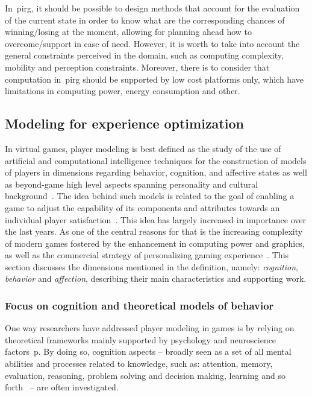 In~\gls{pirg}, it should be possible to design methods that account for the evaluation of the current state in order to know what are the corresponding chances of winning/losing at the moment, allowing for planning ahead how to overcome/support in case of need. However, it is worth to take into account the general constraints perceived in the domain, such as computing complexity, mobility and perception constraints. %
Moreover, there is to consider that computation in~\gls{pirg} should be supported by low cost platforms only, which have limitations in computing power, energy consumption and other. 

\subsection{Modeling for experience optimization}\label{expOptimization}
In virtual games, player modeling is best defined as the study of the use of artificial and computational intelligence techniques for the construction of models of players in dimensions regarding behavior, cognition, and affective states as well as beyond-game high level aspects spanning personality and cultural background~\citep{yannakakis_player_2013}. The idea behind such models is related to the goal of enabling a game to adjust the capability of its components and attributes towards an individual player satisfaction~\cite{herik_opponent_2005}. This idea has largely increased in importance over the last years. As one of the central reasons for that is the increasing complexity of modern games fostered by the enhancement in computing power and graphics, as well as the commercial strategy of personalizing gaming experience~\citep{teng_customization_2010, herik_opponent_2005}. This section discusses the dimensions mentioned in the definition, namely: \textit{cognition}, \textit{behavior} and \textit{affection}, describing their main characteristics and supporting work.

\subsubsection{Focus on cognition and theoretical models of behavior}
One way researchers have addressed player modeling in games is by relying on theoretical frameworks mainly supported by psychology and neuroscience factors~p\cite{yannakakis_player_2013}. By doing so, cognition aspects -- broadly seen as a set of all mental abilities and processes related to knowledge, such as: attention, memory, evaluation, reasoning, problem solving and decision making, learning and so forth~\citep{wiki:cognition} -- are often investigated. 

